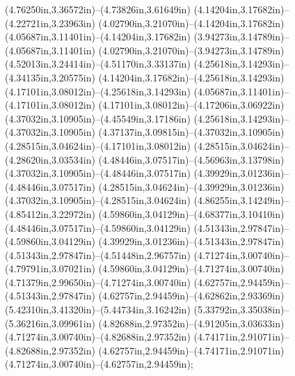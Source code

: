 (4.76250in,3.36572in)--(4.73826in,3.61649in) (4.14204in,3.17682in)--(4.22721in,3.23963in) (4.02790in,3.21070in)--(4.14204in,3.17682in) (4.05687in,3.11401in)--(4.14204in,3.17682in) (3.94273in,3.14789in)--(4.05687in,3.11401in) (4.02790in,3.21070in)--(3.94273in,3.14789in) (4.52013in,3.24414in)--(4.51170in,3.33137in) (4.25618in,3.14293in)--(4.34135in,3.20575in) (4.14204in,3.17682in)--(4.25618in,3.14293in) (4.17101in,3.08012in)--(4.25618in,3.14293in) (4.05687in,3.11401in)--(4.17101in,3.08012in) (4.17101in,3.08012in)--(4.17206in,3.06922in) (4.37032in,3.10905in)--(4.45549in,3.17186in) (4.25618in,3.14293in)--(4.37032in,3.10905in) (4.37137in,3.09815in)--(4.37032in,3.10905in) (4.28515in,3.04624in)--(4.17101in,3.08012in) (4.28515in,3.04624in)--(4.28620in,3.03534in) (4.48446in,3.07517in)--(4.56963in,3.13798in) (4.37032in,3.10905in)--(4.48446in,3.07517in) (4.39929in,3.01236in)--(4.48446in,3.07517in) (4.28515in,3.04624in)--(4.39929in,3.01236in) (4.37032in,3.10905in)--(4.28515in,3.04624in) (4.86255in,3.14249in)--(4.85412in,3.22972in) (4.59860in,3.04129in)--(4.68377in,3.10410in) (4.48446in,3.07517in)--(4.59860in,3.04129in) (4.51343in,2.97847in)--(4.59860in,3.04129in) (4.39929in,3.01236in)--(4.51343in,2.97847in) (4.51343in,2.97847in)--(4.51448in,2.96757in) (4.71274in,3.00740in)--(4.79791in,3.07021in) (4.59860in,3.04129in)--(4.71274in,3.00740in) (4.71379in,2.99650in)--(4.71274in,3.00740in) (4.62757in,2.94459in)--(4.51343in,2.97847in) (4.62757in,2.94459in)--(4.62862in,2.93369in) (5.42310in,3.41320in)--(5.44734in,3.16242in) (5.33792in,3.35038in)--(5.36216in,3.09961in) (4.82688in,2.97352in)--(4.91205in,3.03633in) (4.71274in,3.00740in)--(4.82688in,2.97352in) (4.74171in,2.91071in)--(4.82688in,2.97352in) (4.62757in,2.94459in)--(4.74171in,2.91071in) (4.71274in,3.00740in)--(4.62757in,2.94459in);
